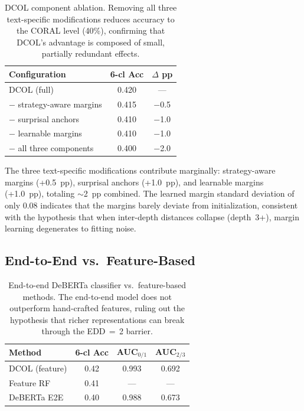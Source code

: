 \documentclass[11pt,a4paper]{article}
\begin{document}
\begin{table}[t]
\centering
\small
\begin{tabular}{lcc}
\toprule
\textbf{Configuration} & \textbf{6-cl Acc} & \textbf{$\Delta$ pp} \\
\midrule
DCOL (full) & 0.420 & --- \\
$-$ strategy-aware margins & 0.415 & $-$0.5 \\
$-$ surprisal anchors & 0.410 & $-$1.0 \\
$-$ learnable margins & 0.410 & $-$1.0 \\
$-$ all three components & 0.400 & $-$2.0 \\
\bottomrule
\end{tabular}
\caption{DCOL component ablation. Removing all three text-specific modifications reduces accuracy to the CORAL level (40\%), confirming that DCOL's advantage is composed of small, partially redundant effects.}
\label{tab:ablation}
\end{table}

The three text-specific modifications contribute marginally: strategy-aware margins (+0.5~pp), surprisal anchors (+1.0~pp), and learnable margins (+1.0~pp), totaling $\sim$2~pp combined.
The learned margin standard deviation of only 0.08 indicates that the margins barely deviate from initialization, consistent with the hypothesis that when inter-depth distances collapse (depth~3+), margin learning degenerates to fitting noise.

\subsection{End-to-End vs.\ Feature-Based}

\begin{table}[t]
\centering
\small
\begin{tabular}{lccc}
\toprule
\textbf{Method} & \textbf{6-cl Acc} & \textbf{AUC$_{0/1}$} & \textbf{AUC$_{2/3}$} \\
\midrule
DCOL (feature) & 0.42 & 0.993 & 0.692 \\
Feature RF & 0.41 & --- & --- \\
DeBERTa E2E & 0.40 & 0.988 & 0.673 \\
\bottomrule
\end{tabular}
\caption{End-to-end DeBERTa classifier vs.\ feature-based methods. The end-to-end model does not outperform hand-crafted features, ruling out the hypothesis that richer representations can break through the EDD\,$=$\,2 barrier.}
\label{tab:e2e}
\end{table}
\end{document}
